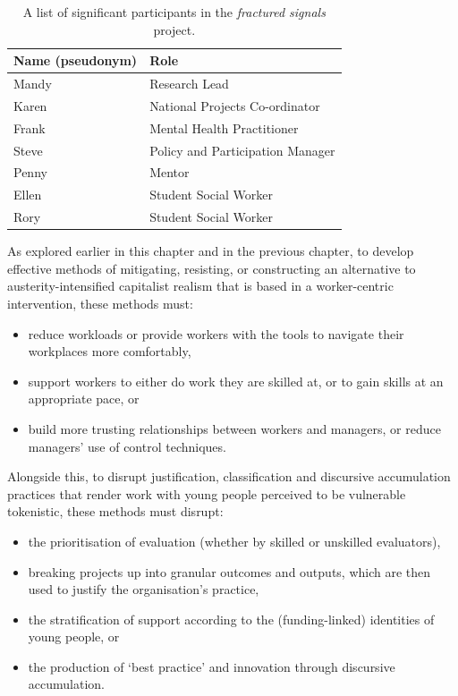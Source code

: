 \begin{table}[]
\centering
\begin{tabular}{|l|l|} \hline 
\textbf{Name (pseudonym)} & \textbf{Role}                    \\ \hline 
Mandy                     & Research Lead                    \\ \hline 
Karen                     & National Projects Co-ordinator   \\ \hline 
Frank                     & Mental Health Practitioner       \\ \hline 
Steve                     & Policy and Participation Manager \\ \hline 
Penny                     & Mentor                           \\ \hline 
Ellen                     & Student Social Worker            \\ \hline 
Rory                      & Student Social Worker           
 \\ \hline\end{tabular}

\caption{A list of significant participants in the \emph{fractured signals} project.}
\label{tab:fs-participants}
\end{table}
As explored earlier in this chapter and in the previous chapter, to develop effective methods of mitigating, resisting, or constructing an alternative to austerity-intensified capitalist realism that is based in a worker-centric intervention, these methods must:
\begin{itemize}
\item reduce workloads or provide workers with the tools to navigate their workplaces more comfortably,
\item support workers to either do work they are skilled at, or to gain skills at an appropriate pace, or
\item build more trusting relationships between workers and managers, or reduce managers' use of control techniques.
\end{itemize}
Alongside this, to disrupt justification, classification and discursive accumulation practices that render work with young people perceived to be vulnerable tokenistic, these methods must disrupt:
\begin{itemize}
    \item  the prioritisation of evaluation (whether by skilled or unskilled evaluators),
    \item breaking projects up into granular outcomes and outputs, which are then used to justify the organisation's practice,
    \item  the stratification of support according to the (funding-linked) identities of young people, or
    \item  the production of `best practice' and innovation through discursive accumulation.
\end{itemize}
